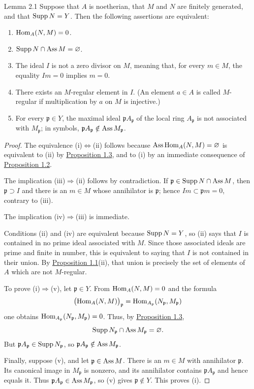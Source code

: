 \begin{sgastatement}{Lemma 2.1}
Suppose that $A$ is noetherian, that $M$ and $N$ are finitely generated, and
that $\operatorname{Supp} N=Y$. Then the following assertions are equivalent:
\begin{enumerate}[label=\textup{(\roman*)},leftmargin=2.6em]
\item $\operatorname{Hom}_A(N,M)=0$.
\item $\operatorname{Supp} N\cap\operatorname{Ass} M=\varnothing$.
\item The ideal $I$ is not a zero divisor on $M$, meaning that, for every
$m\in M$, the equality $Im=0$ implies $m=0$.
\item There exists an $M$-regular element in $I$. (An element $a\in A$ is
called $M$-regular if multiplication by $a$ on $M$ is injective.)
\item For every $\mathfrak p\in Y$, the maximal ideal
$\mathfrak pA_{\mathfrak p}$ of the local ring $A_{\mathfrak p}$ is not
associated with $M_{\mathfrak p}$; in symbols,
$\mathfrak pA_{\mathfrak p}\notin\operatorname{Ass} M_{\mathfrak p}$.
\end{enumerate}
\end{sgastatement}

\begin{proof}
The equivalence (i)$\Leftrightarrow$(ii) follows because
$\operatorname{Ass}\operatorname{Hom}_A(N,M)=\varnothing$ is equivalent to (ii) by \hyperref[III.1.3]{Proposition 1.3},
and to (i) by an immediate consequence of \hyperref[III.1.2]{Proposition 1.2}.

The implication (iii)$\Rightarrow$(ii) follows by contradiction. If
$\mathfrak p\in\operatorname{Supp} N\cap\operatorname{Ass} M$, then $\mathfrak p\supset I$ and there
is an $m\in M$ whose annihilator is $\mathfrak p$; hence
$Im\subset\mathfrak p m=0$, contrary to (iii).

The implication (iv)$\Rightarrow$(iii) is immediate.

Conditions (ii) and (iv) are equivalent because $\operatorname{Supp} N=Y$, so (ii) says
that $I$ is contained in no prime ideal associated with $M$. Since those
associated ideals are prime and finite in number, this is equivalent to
saying that $I$ is not contained in their union. By \hyperref[III.1.1]{Proposition 1.1}(ii),
that union is precisely the set of elements of $A$ which are not
$M$-regular.

To prove (i)$\Rightarrow$(v), let $\mathfrak p\in Y$. From
$\operatorname{Hom}_A(N,M)=0$ and the formula
\[
  \bigl(\operatorname{Hom}_A(N,M)\bigr)_{\mathfrak p}
  =\operatorname{Hom}_{A_{\mathfrak p}}(N_{\mathfrak p},M_{\mathfrak p})
\]
one obtains $\operatorname{Hom}_{A_{\mathfrak p}}(N_{\mathfrak p},M_{\mathfrak p})=0$.
Thus, by \hyperref[III.1.3]{Proposition 1.3},
\[
  \operatorname{Supp} N_{\mathfrak p}\cap\operatorname{Ass} M_{\mathfrak p}=\varnothing.
\]
But $\mathfrak pA_{\mathfrak p}\in\operatorname{Supp} N_{\mathfrak p}$, so
$\mathfrak pA_{\mathfrak p}\notin\operatorname{Ass} M_{\mathfrak p}$.

Finally, suppose (v), and let $\mathfrak p\in\operatorname{Ass} M$. There is an
$m\in M$ with annihilator $\mathfrak p$. Its canonical image in
$M_{\mathfrak p}$ is nonzero, and its annihilator contains
$\mathfrak pA_{\mathfrak p}$ and hence equals it. Thus
$\mathfrak pA_{\mathfrak p}\in\operatorname{Ass} M_{\mathfrak p}$, so (v) gives
$\mathfrak p\notin Y$. This proves (i).
\end{proof}

